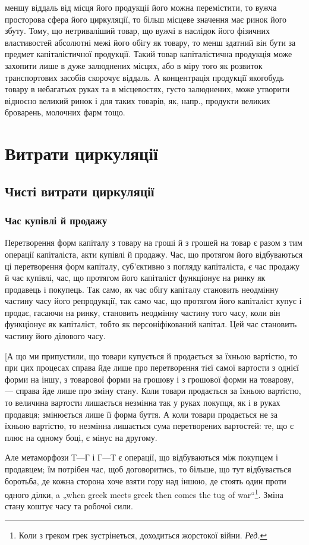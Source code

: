 \parcont{}  %
меншу віддаль від місця його продукції його можна перемістити, то
вужча просторова сфера його циркуляції, то більш місцеве значення має
ринок його збуту. Тому, що нетриваліший товар, що вужчі в наслідок
його фізичних властивостей абсолютні межі його обігу як товару, то
менш здатний він бути за предмет капіталістичної продукції. Такий
товар капіталістична продукція може захопити лише в дуже залюднених
місцях, або в міру того як розвиток транспортових засобів скорочує
віддаль. А концентрація продукції якогобудь товару в небагатьох руках
та в місцевостях, густо залюднених, може утворити відносно великий ринок
і для таких товарів, як, напр., продукти великих броварень, молочних
фарм тощо.

\section{Витрати циркуляції}

\subsection{Чисті витрати циркуляції}

\subsubsection{Час купівлі й продажу}

Перетворення форм капіталу з товару на гроші й з грошей на
товар є разом з тим операції капіталіста, акти купівлі й продажу. Час,
що протягом його відбуваються ці перетворення форм капіталу, суб’єктивно
з погляду капіталіста, є час продажу й час купівлі, час, що протягом
його капіталіст функціонує на ринку як продавець і покупець. Так само,
як час обігу капіталу становить неодмінну частину часу його репродукції,
так само час, що протягом його капіталіст купує і продає, гасаючи на
ринку, становить неодмінну частину того часу, коли він функціонує як
капіталіст, тобто як персоніфікований капітал. Цей час становить частину
його ділового часу.

[А що ми припустили, що товари купується й продається за їхньою
вартістю, то при цих процесах справа йде лише про перетворення тієї
самої вартости з однієї форми на іншу, з товарової форми на грошову
і з грошової форми на товарову, — справа йде лише про зміну стану.
Коли товари продається за їхньою вартістю, то величина вартости
лишається незмінна так у руках покупця, як і в руках продавця; змінюється
лише її форма буття. А коли товари продається не за їхньою вартістю,
то незмінна лишається сума перетворених вартостей: те, що є плюс на
одному боці, є мінус на другому.

Але метаморфози $Т — Г$ і $Г — Т$ є операції, що відбуваються між
покупцем і продавцем; їм потрібен час, щоб договоритись, то більше,
що тут відбувається боротьба, де кожна сторона хоче взяти гору над
іншою, де стоять один проти одного ділки, a „when greek meets greek
then comes the tug of war“\footnote*{
Коли з греком грек зустрінеться, доходиться жорстокої війни. \emph{Ред.}
}. Зміна стану коштує часу та робочої сили.
\parbreak{}  %
